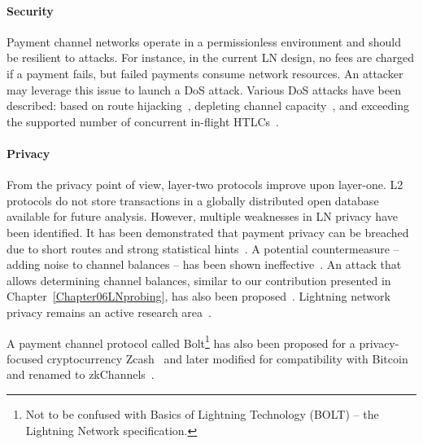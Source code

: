 \paragraph{Security}
Payment channel networks operate in a permissionless environment and should be resilient to attacks.
For instance, in the current LN design, no fees are charged if a payment fails, but failed payments consume network resources.
An attacker may leverage this issue to launch a DoS attack.
Various DoS attacks have been described: based on route hijacking~\cite{Tochner2019}, depleting channel capacity~\cite{PerezSola2019}, and exceeding the supported number of concurrent in-flight HTLCs~\cite{Mizrahi2020}.

\paragraph{Privacy}
From the privacy point of view, layer-two protocols improve upon layer-one.
L2 protocols do not store transactions in a globally distributed open database available for future analysis.
However, multiple weaknesses in LN privacy have been identified.
It has been demonstrated that payment privacy can be breached due to short routes and strong statistical hints~\cite{Beres2019}.
A potential countermeasure -- adding noise to channel balances -- has been shown ineffective~\cite{Tang2019}.
An attack that allows determining channel balances, similar to our contribution presented in Chapter~\ref{Chapter06LNprobing}, has also been proposed~\cite{HerreraJoancomarti2019}.
Lightning network privacy remains an active research area~\cite{Malavolta2017, Kohen2019, Tang2020, Rohrer2020, Kappos2020}.

A payment channel protocol called Bolt\footnote{Not to be confused with Basics of Lightning Technology (BOLT) -- the Lightning Network specification.} has also been proposed for a privacy-focused cryptocurrency Zcash~\cite{Green2017} and later modified for compatibility with Bitcoin and renamed to zkChannels~\cite{Akinyele2020}.

